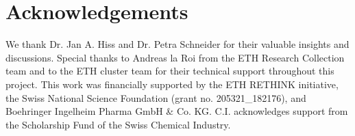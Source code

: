 \section*{Acknowledgements} 
We thank Dr. Jan A. Hiss and Dr. Petra Schneider for their valuable insights and discussions. Special thanks to Andreas la Roi from the ETH Research Collection team and to the ETH cluster team for their technical support throughout this project. This work was financially supported by the ETH RETHINK initiative, the Swiss National Science Foundation (grant no. 205321\_182176), and Boehringer Ingelheim Pharma GmbH \& Co. KG. C.I. acknowledges  support from the Scholarship Fund of the Swiss Chemical Industry.\\
